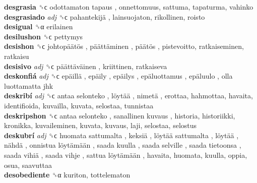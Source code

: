 \textbf{desgrasia} ␝ϲ   odottamaton tapaus , onnettomuus, sattuma, tapaturma, vahinko  \\
\textbf{desgrasiado} \emph{adj}  ␝ϲ   pahantekijä , lainsuojaton, rikollinen, roisto  \\
\textbf{desigual} ␝α  erilainen  \\
\textbf{desilushon} ␝ϲ  pettymys  \\
\textbf{desishon} ␝ϲ   johtopäätös ,  päättäminen ,  päätös , pistevoitto, ratkaiseminen, ratkaisu  \\
\textbf{desisivo} \emph{adj}  ␝ϲ   päättäväinen , kriittinen, ratkaiseva  \\
\textbf{deskonfiá} \emph{adj}  ␝ϲ   epäillä ,  epäily ,  epäilys ,  epäluottamus ,  epäluulo ,  olla luottamatta jhk   \\
\textbf{deskribí} \emph{adj}  ␝ϲ   antaa selonteko ,  löytää ,  nimetä , erottaa, hahmottaa, havaita, identifioida, kuvailla, kuvata, selostaa, tunnistaa  \\
\textbf{deskripshon} ␝ϲ   antaa selonteko ,  sanallinen kuvaus , historia, historiikki, kronikka, kuvaileminen, kuvata, kuvaus, laji, selostaa, selostus  \\
\textbf{deskubrí} \emph{adj}  ␝ϲ   huomata sattumalta ,  keksiä ,  löytää sattumalta ,  löytää ,  nähdä ,  onnistua löytämään ,  saada kuulla ,  saada selville ,  saada tietoonsa ,  saada vihiä ,  saada vihje ,  sattua löytämään , havaita, huomata, kuulla, oppia, osua, saavuttaa  \\
\textbf{desobediente} ␝α  kuriton, tottelematon  \\
